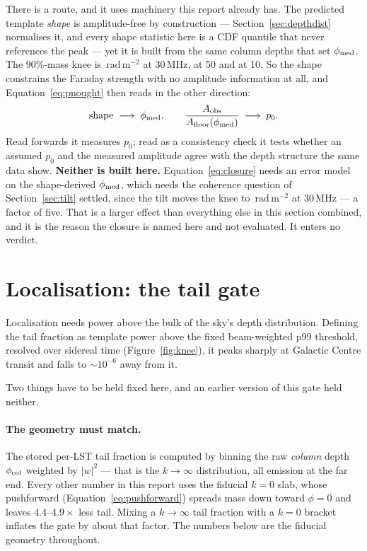 \documentclass[11pt]{article}
\newcommand{\rmu}{\ensuremath{\mathrm{rad\,m^{-2}}}}
\begin{document}
There is a route, and it uses machinery this report already has. The
predicted template \emph{shape} is amplitude-free by construction ---
Section~\ref{sec:depthdist} normalises it, and every shape statistic
here is a CDF quantile that never references the peak --- yet it is
built from the same column depths that set $\phi_{\rm med}$. The
90\%-mass knee is \kneeThirty\,\rmu{} at 30\,MHz, \kneeFifty{} at 50
and \kneeTen{} at 10. So the shape constrains the Faraday strength
with no amplitude information at all, and
Equation~\eqref{eq:pnought} then reads in the other direction:
\begin{equation}
  \text{shape} \;\longrightarrow\; \phi_{\rm med},
  \qquad
  \frac{A_{\rm obs}}{A_{\rm floor}(\phi_{\rm med})}
  \;\longrightarrow\; p_{0}.
  \label{eq:closure}
\end{equation}
Read forwards it measures $p_{0}$; read as a consistency check it tests
whether an assumed $p_{0}$ and the measured amplitude agree with the
depth structure the same data show. \textbf{Neither is built here.}
Equation~\eqref{eq:closure} needs an error model on the shape-derived
$\phi_{\rm med}$, which needs the coherence question of
Section~\ref{sec:tilt} settled, since the tilt moves the knee to
\tiltKneeThirty\,\rmu{} at 30\,MHz --- a factor of five. That is a
larger effect than everything else in this section combined, and it is
the reason the closure is named here and not evaluated. It enters no
verdict.

\section{Localisation: the tail gate}
\label{sec:tail}

Localisation needs power above the bulk of the sky's depth
distribution. Defining the tail fraction as template power above the
fixed beam-weighted p99 threshold, resolved over sidereal time
(Figure~\ref{fig:knee}), it peaks sharply at Galactic Centre transit
and falls to $\sim10^{-6}$ away from it.

Two things have to be held fixed here, and an earlier version of this
gate held neither.

\paragraph{The geometry must match.} The stored per-LST tail fraction
is computed by binning the raw \emph{column} depth $\phi_{\rm col}$
weighted by $|w|^2$ --- that is the $k\to\infty$ distribution, all
emission at the far end. Every other number in this report uses the
fiducial $k=0$ slab, whose pushforward
(Equation~\eqref{eq:pushforward}) spreads mass down toward $\phi = 0$
and leaves $4.4$--$4.9\times$ less tail. Mixing a $k\to\infty$ tail
fraction with a $k=0$ bracket inflates the gate by about that factor.
The numbers below are the fiducial geometry throughout.
\end{document}
